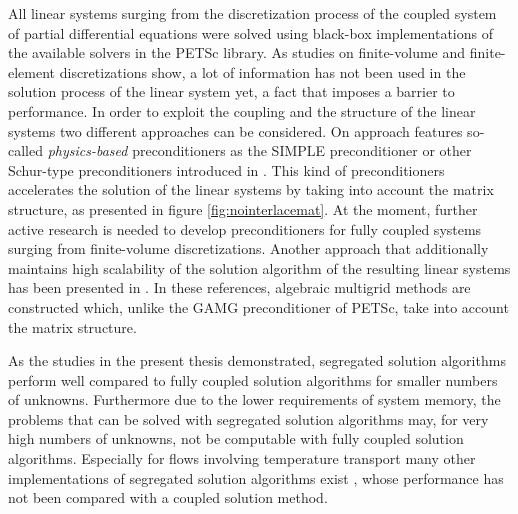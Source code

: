 All linear systems surging from the discretization process of the coupled system of partial differential equations were solved using black-box implementations of the available solvers in the PETSc library. As studies on finite-volume \cite{klaij13,darwish09,mangani14} and finite-element \cite{brown12,elman03,elman08,silvester01,turek02,mcinnes14} discretizations show, a lot of information has not been used in the solution process of the linear system yet, a fact that imposes a barrier to performance. In order to exploit the coupling and the structure of the linear systems two different approaches can be considered. On approach features so-called \emph{physics-based} preconditioners as the SIMPLE preconditioner or other Schur-type preconditioners introduced in \cite{klaij13,elman08}. This kind of preconditioners accelerates the solution of the linear systems by taking into account the matrix structure, as presented in figure \ref{fig:nointerlacemat}. At the moment, further active research is needed to develop preconditioners for fully coupled systems surging from finite-volume discretizations. Another approach that additionally maintains high scalability of the solution algorithm of the resulting linear systems has been presented in \cite{darwish09,mangani14}. In these references, algebraic multigrid methods are constructed which, unlike the GAMG preconditioner of PETSc, take into account the matrix structure.

As the studies in the present thesis demonstrated, segregated solution algorithms perform well compared to fully coupled solution algorithms for smaller numbers of unknowns. Furthermore due to the lower requirements of system memory, the problems that can be solved with segregated solution algorithms may, for very high numbers of unknowns, not be computable with fully coupled solution algorithms. Especially for flows involving temperature transport many other implementations of segregated solution algorithms exist \cite{liu84,oliveira01}, whose performance has not been compared with a coupled solution method.

